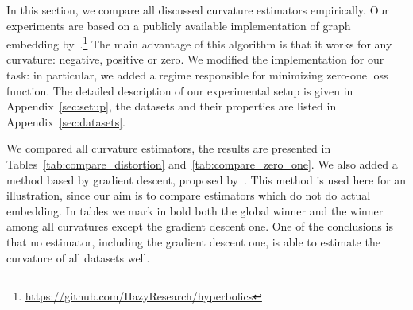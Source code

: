 \documentclass{article} %
\begin{document}
In this section, we compare all discussed curvature estimators empirically. Our experiments are based on a publicly available implementation of graph embedding by~\citet{gu2019learning}.\footnote{\url{https://github.com/HazyResearch/hyperbolics}} The main advantage of this algorithm is that it works for any curvature: negative, positive or zero. We modified the implementation for our task: in particular, we added a regime responsible for minimizing zero-one loss function. The detailed description of our experimental setup is given in Appendix~\ref{sec:setup}, the datasets and their properties are listed in Appendix~\ref{sec:datasets}.

We compared all curvature estimators, the results are presented in Tables~\ref{tab:compare_distortion} and~\ref{tab:compare_zero_one}. We also added a method based by gradient descent, proposed by~\citet{gu2019learning}. This method is used here for an illustration, since our aim is to compare estimators which do not do actual embedding. 
In tables we mark in bold both the global winner and the winner among all curvatures except the gradient descent one. One of the conclusions is that no estimator, including the gradient descent one, is able to estimate the curvature of all datasets well.
\end{document}
